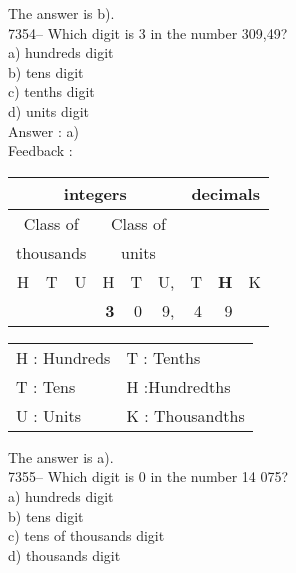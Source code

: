 \documentclass[letterpaper, 12pt]{article}
\begin{document}
\normalsize
The answer is b).\\





7354-- Which digit is  3 in the number 309,49?\\

a) hundreds digit\\
b) tens digit\\
c) tenths digit\\
d) units digit\\

Answer : a)\\

Feedback :\\
\begin{center}
\begin{tabular}{|rrr|rrr|rrr|}
\hline
\multicolumn{6}{|c|}{integers} &\multicolumn{3}{|c|}{decimals} \\
\hline
\multicolumn{3}{|c|}{Class of} &\multicolumn{3}{|c|}{Class of} &  \multicolumn{3}{c|}{} \\
\multicolumn{3}{|c|}{thousands} &\multicolumn{3}{|c|}{units} &  \multicolumn{3}{c|}{} \\
\hline
H & T & U &H & T & U, & T\up{th} & \textbf{H\up{th}} & K\up{th} \\
\hline
\hline
& & &\textbf{3} & 0 & 9, & 4 & 9 & \\
\hline
\end{tabular}
\end{center}

\scriptsize
\begin{center}
\begin{tabular}{ll}
H : Hundreds & T\up{th} : Tenths\\
T : Tens & H\up{th} :Hundredths\\
U : Units & K\up{e} : Thousandths\\
\end{tabular}
\end{center}

\normalsize
The answer is a).\\





7355-- Which digit is 0 in the number 14 075?\\

a) hundreds digit\\
b) tens digit\\
c) tens of thousands digit\\
d) thousands digit\\
\end{document}
